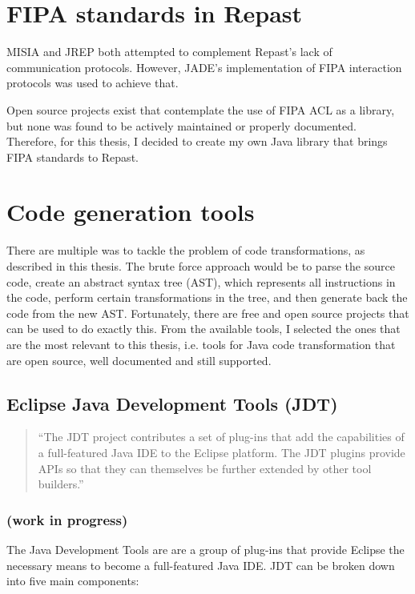
\section{FIPA standards in Repast}
	MISIA and JREP both attempted to complement Repast's lack of communication protocols. However, JADE's implementation of FIPA interaction protocols was used to achieve that. 

	Open source projects exist that contemplate the use of FIPA ACL as a library, but none was found to be actively maintained or properly documented. Therefore, for this thesis, I decided to create my own Java library that brings FIPA standards to Repast.


\section{Code generation tools}
	There are multiple was to tackle the problem of code transformations, as described in this thesis. The brute force approach would be to parse the source code, create an abstract syntax tree (AST), which represents all instructions in the code, perform certain transformations in the tree, and then generate back the code from the new AST. Fortunately, there are free and open source projects that can be used to do exactly this. From the available tools, I selected the ones that are the most relevant to this thesis, i.e. tools for Java code transformation that are open source, well documented and still supported. 

\subsection{Eclipse Java Development Tools (JDT)}

\begin{quote}
	``The JDT project contributes a set of plug-ins that add the capabilities of a full-featured Java IDE to the Eclipse platform. The JDT plugins provide APIs so that they can themselves be further extended by other tool builders.'' \cite{eclipseJDT}
\end{quote}
	
	\subsubsection{(work in progress)}

	The Java Development Tools are are a group of plug-ins that provide Eclipse the necessary means to become a full-featured Java IDE. JDT can be broken down into five main components: 


